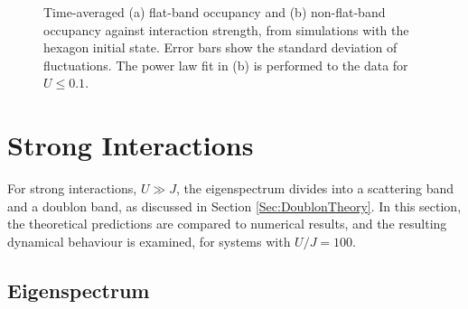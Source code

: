 \vspace{1cm}

\begin{figure}[ht]
    \centering
    \hfill
    \caption{Time-averaged (a) flat-band occupancy and (b) non-flat-band occupancy against interaction strength, from simulations with the hexagon initial state. Error bars show the standard deviation of fluctuations. The power law fit in (b) is performed to the data for $U\leq 0.1$.}
    \label{Fig:FB_NFB_Character}
\end{figure}

\section{Strong Interactions}\label{Sec:Strong_Interactions}

For strong interactions, $U\gg J$, the eigenspectrum divides into a scattering band and a doublon band, as discussed in Section \ref{Sec:DoublonTheory}. In this section, the theoretical predictions are compared to numerical results, and the resulting dynamical behaviour is examined, for systems with $U/J=100$. 

\subsection{Eigenspectrum}\label{Sec:Doublon_Eigenspectrum}

